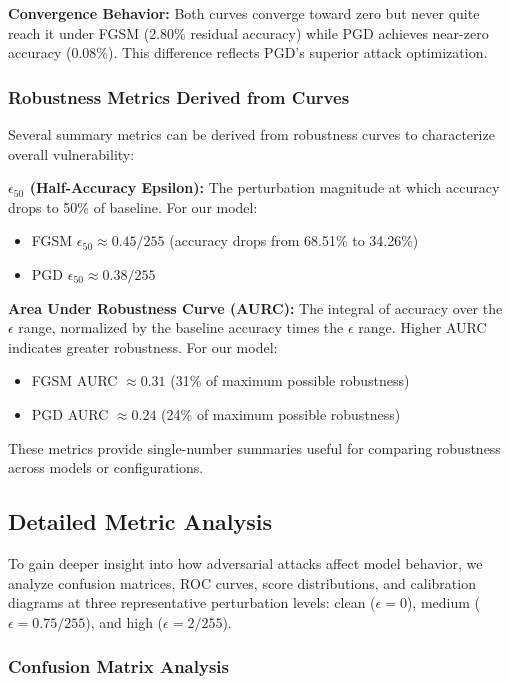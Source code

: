 \documentclass[12pt,a4paper]{article}
\begin{document}
\textbf{Convergence Behavior:} Both curves converge toward zero but never quite reach it under FGSM (2.80\% residual accuracy) while PGD achieves near-zero accuracy (0.08\%). This difference reflects PGD's superior attack optimization.

\subsubsection{Robustness Metrics Derived from Curves}

Several summary metrics can be derived from robustness curves to characterize overall vulnerability:

\textbf{$\epsilon_{50}$ (Half-Accuracy Epsilon):} The perturbation magnitude at which accuracy drops to 50\% of baseline. For our model:
\begin{itemize}[leftmargin=*]
    \item FGSM $\epsilon_{50} \approx 0.45/255$ (accuracy drops from 68.51\% to 34.26\%)
    \item PGD $\epsilon_{50} \approx 0.38/255$
\end{itemize}

\textbf{Area Under Robustness Curve (AURC):} The integral of accuracy over the $\epsilon$ range, normalized by the baseline accuracy times the $\epsilon$ range. Higher AURC indicates greater robustness. For our model:
\begin{itemize}[leftmargin=*]
    \item FGSM AURC $\approx 0.31$ (31\% of maximum possible robustness)
    \item PGD AURC $\approx 0.24$ (24\% of maximum possible robustness)
\end{itemize}

These metrics provide single-number summaries useful for comparing robustness across models or configurations.

\subsection{Detailed Metric Analysis}

To gain deeper insight into how adversarial attacks affect model behavior, we analyze confusion matrices, ROC curves, score distributions, and calibration diagrams at three representative perturbation levels: clean ($\epsilon=0$), medium ($\epsilon=0.75/255$), and high ($\epsilon=2/255$).

\subsubsection{Confusion Matrix Analysis}
\end{document}
